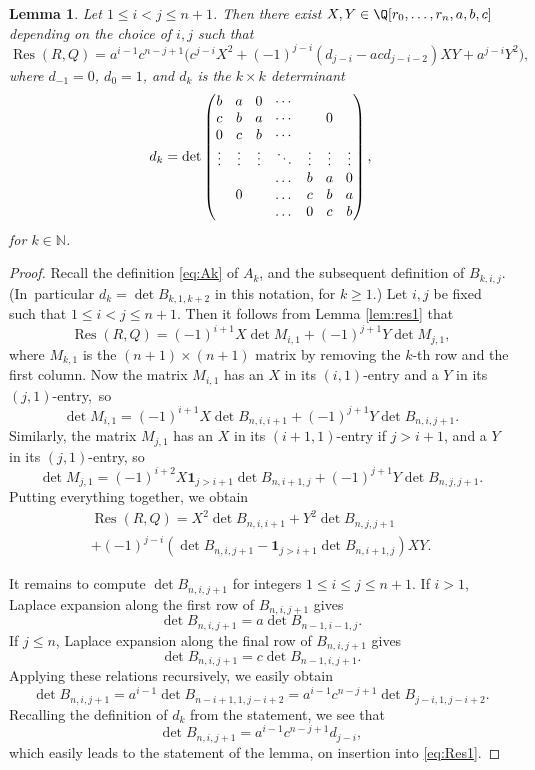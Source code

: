 \documentclass[JEP,XML,SOM,Unicode]{cedram}
\DeclareMathOperator{\Res}{Res}
\newcommand{\NN}{\mathbb{N}}
\newtheorem{lemma}[theorem]{Lemma}
\begin{document}
\begin{lemma}\label{lem:res2}
Let $1\leq i<j\leq n+1$.
Then there exist $X,Y\in\Q[r_0,\dots, r_n,a,b,c]$ depending on the choice of $i,j$ such that
\[
\Res(R,Q)
=a^{i-1}c^{n-j+1}\bigl(c^{j-i}X^2+(-1)^{j-i}(d_{j-i}-acd_{j-i-2})XY+a^{j-i}Y^2\bigr),
\]
where
$d_{-1}=0$, $d_0=1$, and $d_k$ is the $k\times k$ determinant
\[\arraycolsep4.5pt
d_k=\det
\begin{pmatrix}
b & a & 0& \cdots & & & \\
c & b& a& \cdots & & 0&\\
0 & c& b& \cdots & & & \\
\vdots & \vdots &\vdots & \ddots &\vdots &\vdots &\vdots \\
& & & \dots& b& a& 0\\
& 0 & &\dots& c& b& a\\
& & &\dots & 0& c& b
\end{pmatrix},
\]
for $k\in \NN$.
\end{lemma}

\begin{proof}
Recall the definition \eqref{eq:Ak} of $A_k$,
and the subsequent definition of $B_{k,i,j}$.
(In~particular $d_k=\det B_{k,1,k+2}$ in this notation, for $k\geq 1$.)
Let $i,j$ be fixed such that $1\leq i<j\leq n+1$. Then
it follows from Lemma \ref{lem:res1} that
\[
\Res(R,Q)=(-1)^{i+1}X\det M_{i,1}+(-1)^{j+1}Y\det M_{j,1},
\]
where $M_{k,1}$ is the $(n+1)\times(n+1)$ matrix by removing the $k$-th row and the first column.
Now the matrix $M_{i,1}$ has an $X$ in its $(i,1)$-entry and a $Y$ in its $(j,1)$-entry,~so
\[
\det M_{i,1}=(-1)^{i+1}X\det B_{n,i,i+1}+(-1)^{j+1}Y\det B_{n,i,j+1}.
\]
Similarly,
the matrix $M_{j,1}$ has an $X$ in its $(i+1,1)$-entry if $j>i+1$, and a $Y$ in its $(j,1)$-entry, so
\[
\det M_{j,1}=(-1)^{i+2}X\mathbf{1}_{j> i+1}\det B_{n,i+1,j}+(-1)^{j+1} Y\det B_{n,j,j+1}.
\]
Putting everything together, we obtain
\begin{multline}\label{eq:Res1}
\Res(R,Q)
=
X^2\det B_{n,i,i+1}
+Y^2 \det B_{n,j,j+1}\\
+(-1)^{j-i}\left(\det B_{n,i,j+1}-\mathbf{1}_{j> i+1}\det B_{n,i+1,j}\right)XY.
\end{multline}

It remains to compute $\det B_{n,i,j+1}$ for
integers $1\leq i\leq j\leq n+1$.
If $i>1$, Laplace expansion along the first row of $B_{n,i,j+1}$ gives
\[
\det B_{n,i,j+1}=a\det B_{n-1,i-1,j}.
\]
If $j\leq n$, Laplace expansion along the final row of $B_{n,i,j+1}$ gives
\[
\det B_{n,i,j+1}=c\det B_{n-1,i,j+1}.
\]
Applying these relations recursively, we easily obtain
\[
\det B_{n,i,j+1}
=a^{i-1}\det B_{n-i+1,1,j-i+2}
=a^{i-1}c^{n-j+1}
\det B_{j-i,1,j-i+2}.
\]
Recalling the definition of $d_k$ from the statement,
we see that
\[
\det B_{n,i,j+1}=a^{i-1}c^{n-j+1}d_{j-i},
\]
which easily leads to the statement of the lemma, on insertion into \eqref{eq:Res1}.
\end{proof}
\end{document}

